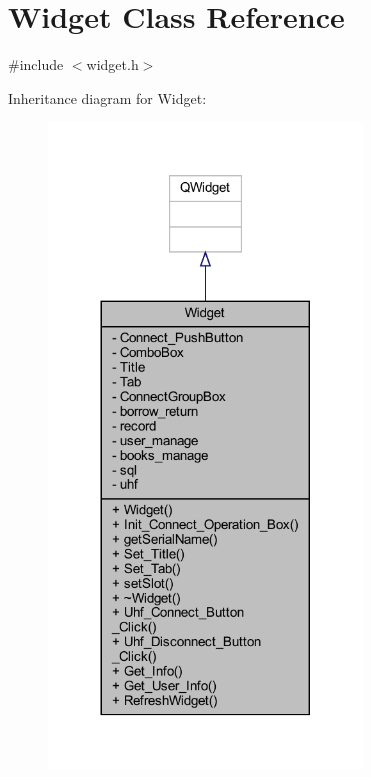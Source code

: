 \hypertarget{class_widget}{}\section{Widget Class Reference}
\label{class_widget}


{\ttfamily \#include $<$widget.\+h$>$}



Inheritance diagram for Widget\+:
\nopagebreak
\begin{figure}[H]
\begin{center}
\leavevmode
\includegraphics[width=236pt]{class_widget__inherit__graph}
\end{center}
\end{figure}


